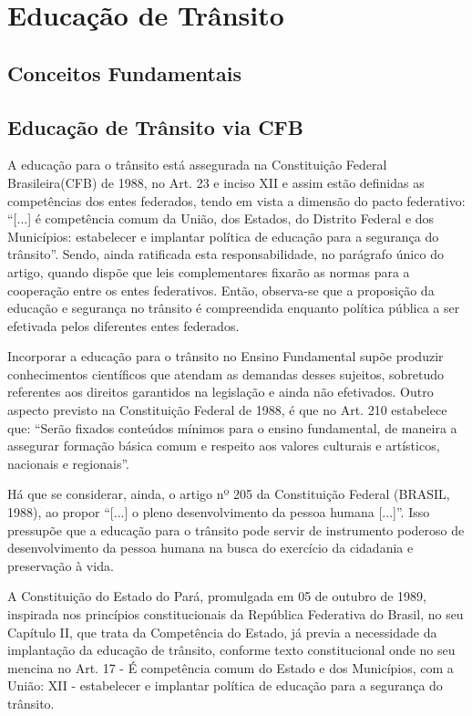 \chapter{Educação de Trânsito}
\section{Conceitos Fundamentais}


\section{Educação de Trânsito via CFB}

A educação para o trânsito está assegurada na Constituição Federal Brasileira(CFB) de 1988, no Art. 23 e inciso XII e assim estão definidas as competências dos entes federados, tendo em vista a dimensão do pacto federativo: “[...] é competência comum da União, dos Estados, do Distrito Federal e dos Municípios: estabelecer e implantar política de educação para a segurança do trânsito”.  Sendo, ainda ratificada esta responsabilidade, no parágrafo único do artigo, quando dispõe que leis complementares fixarão as normas para a cooperação entre os entes federativos. Então, observa-se que a proposição da educação e segurança no trânsito é compreendida enquanto política pública a ser efetivada pelos diferentes entes federados.\vskip0.3cm


Incorporar a educação para o trânsito no Ensino Fundamental supõe produzir conhecimentos científicos que atendam as demandas desses sujeitos, sobretudo referentes aos direitos garantidos na legislação e ainda não efetivados. Outro aspecto previsto na Constituição Federal de 1988, é que no Art. 210 estabelece que: “Serão fixados conteúdos mínimos para o ensino fundamental, de maneira a assegurar formação básica comum e respeito aos valores culturais e artísticos, nacionais e regionais”.\vskip0.3cm

Há que se considerar, ainda, o artigo nº 205 da Constituição Federal (BRASIL, 1988), ao propor “[...] o pleno desenvolvimento da pessoa humana [...]”. Isso pressupõe que a educação para o trânsito pode servir de instrumento poderoso de desenvolvimento da pessoa humana na busca do exercício da cidadania e preservação à vida.\vskip0.3cm

A Constituição do Estado do Pará, promulgada em 05 de outubro de 1989, inspirada nos princípios constitucionais da República Federativa do Brasil, no seu Capítulo II, que trata da Competência do Estado, já previa a necessidade da implantação da educação de trânsito, conforme texto constitucional onde no seu mencina no Art. 17 - É competência comum do Estado e dos Municípios, com a União: XII - estabelecer e implantar política de educação para a segurança do trânsito. \vskip0.3cm

